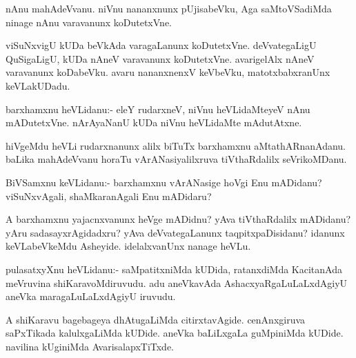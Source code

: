 \documentclass{article}
\begin{document}
\begin{mn}
nAnu mahAdeVvanu. niVnu nananxnunx pUjisabeVku, Aga saMtoVSadiMda
ninage nAnu varavanunx koDutetxVne.
\end{mn}

\begin{mn}%
viSuNxvigU kUDa beVkAda varagaLanunx koDutetxVne. deVvategaLigU
QuSigaLigU, kUDa nAneV varavanunx koDutetxVne. avarigelAlx nAneV
varavanunx koDabeVku. avaru nananxnenxV keVbeVku, matotxbabxranUnx keVLakUDadu.
\end{mn}

\begin{mn}
barxhamxnu heVLidanu:- eleY rudarxneV, niVnu heVLidaMteyeV nAnu
mADutetxVne. nArAyaNanU kUDa niVnu heVLidaMte mAdutAtxne.
\end{mn}

\begin{mn}
hiVgeMdu heVLi rudarxnanunx alilx biTuTx barxhamxnu
aMtathARnanAdanu. baLika mahAdeVvanu horaTu vArANasiyalilxruva
tiVthaRdalilx seVrikoMDanu.
\end{mn}

%
%


\begin{mn}%
BiVSamxnu keVLidanu:- barxhamxnu vArANasige hoVgi Enu mADidanu?
viSuNxvAgali, shaMkaranAgali Enu mADidaru?
\end{mn}

\begin{mn}
A barxhamxnu yajacnxvanunx heVge mADidnu? yAva tiVthaRdalilx mADidanu?
yAru sadasayxrAgidadxru? yAva deVvategaLanunx taqpitxpaDisidanu?
idanunx keVLabeVkeMdu Asheyide. idelalxvanUnx nanage heVLu.
\end{mn}

\begin{mn}
pulasatxyXnu heVLidanu:- saMpatitxniMda kUDida, ratanxdiMda KacitanAda
meVruvina shiKaravoMdiruvudu. adu aneVkavAda AshacxyaRgaLuLaLxdAgiyU
aneVka maragaLuLaLxdAgiyU iruvudu.
\end{mn}

\begin{mn}%
A shiKaravu bagebageya dhAtugaLiMda citirxtavAgide. cenAnxgiruva
saPxTikada kalulxgaLiMda kUDide. aneVka baLiLxgaLa guMpiniMda
kUDide. navilina kUginiMda AvarisalapxTiTxde.
\end{mn}
\end{document}
